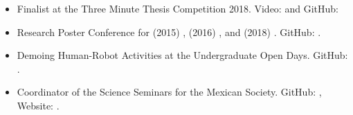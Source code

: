 \documentclass{mycv}
\begin{document}
\begin{itemize}

\item  Finalist at the Three Minute Thesis Competition 2018. Video: \href{https://www.youtube.com/watch?v=07ewRYcS-0g}{\faYoutube} and 
GitHub: \href{https://github.com/mxochicale/3mt}{\faGithub*} 

\item Research Poster Conference for 
(2015) \href{https://github.com/mxochicale/PhD/blob/master/posters/Research_Poster_Conference_UoB/2015/poster/poster.pdf}{\faImage}, 
(2016) \href{https://github.com/mxochicale/PhD/blob/master/posters/Research_Poster_Conference_UoB/2016/poster/poster.pdf}{\faImage}, and  
(2018) \href{https://github.com/mxochicale/PhD/blob/master/posters/Research_Poster_Conference_UoB/2018/poster/main/map479-poster-uob2018.pdf}{\faImage}.
GitHub: \href{https://github.com/mxochicale/PhD/tree/master/posters/Research_Poster_Conference_UoB}{\faGithub*}.
\item Demoing Human-Robot Activities at the Undergraduate Open Days. GitHub: \href{https://github.com/mxochicale/opendayuob-hridemo}{\faGithub*}. 
\item Coordinator of the Science Seminars for the Mexican Society.  GitHub: \href{https://github.com/MexicanSocietyUoB}{\faGithub*}, Website: \href{https://mexicansocietyuob.github.io/seminars/}{\faExternalLink*}. 





\end{itemize}
\end{document}
